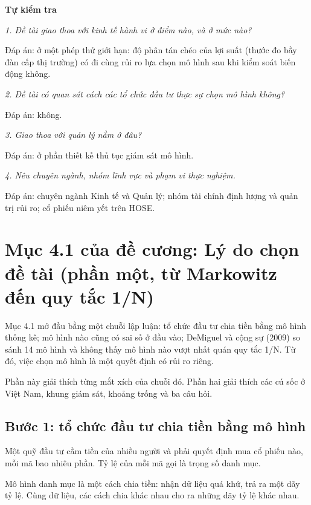 \textbf{Tự kiểm tra}

{\itshape 1. Đề tài giao thoa với kinh tế hành vi ở điểm nào, và ở mức nào?\par}

Đáp án: ở một phép thử giới hạn: độ phân tán chéo của lợi suất (thước đo bầy đàn cấp thị trường) có đi cùng rủi ro lựa chọn mô hình sau khi kiểm soát biến động không.

{\itshape 2. Đề tài có quan sát cách các tổ chức đầu tư thực sự chọn mô hình không?\par}

Đáp án: không.

{\itshape 3. Giao thoa với quản lý nằm ở đâu?\par}

Đáp án: ở phần thiết kế thủ tục giám sát mô hình.

{\itshape 4. Nêu chuyên ngành, nhóm lĩnh vực và phạm vi thực nghiệm.\par}

Đáp án: chuyên ngành Kinh tế và Quản lý; nhóm tài chính định lượng và quản trị rủi ro; cổ phiếu niêm yết trên HOSE.

\chapter{Mục 4.1 của đề cương: Lý do chọn đề tài (phần một, từ Markowitz đến quy tắc 1/N)}

Mục 4.1 mở đầu bằng một chuỗi lập luận: tổ chức đầu tư chia tiền bằng mô hình thống kê; mô hình nào cũng có sai số ở đầu vào; DeMiguel và cộng sự (2009) so sánh 14 mô hình và không thấy mô hình nào vượt nhất quán quy tắc 1/N. Từ đó, việc chọn mô hình là một quyết định có rủi ro riêng.

Phần này giải thích từng mắt xích của chuỗi đó. Phần hai giải thích các cú sốc ở Việt Nam, khung giám sát, khoảng trống và ba câu hỏi.

\section{Bước 1: tổ chức đầu tư chia tiền bằng mô hình}

Một quỹ đầu tư cầm tiền của nhiều người và phải quyết định mua cổ phiếu nào, mỗi mã bao nhiêu phần. Tỷ lệ của mỗi mã gọi là trọng số danh mục.

Mô hình danh mục là một cách chia tiền: nhận dữ liệu quá khứ, trả ra một dãy tỷ lệ. Cùng dữ liệu, các cách chia khác nhau cho ra những dãy tỷ lệ khác nhau.

